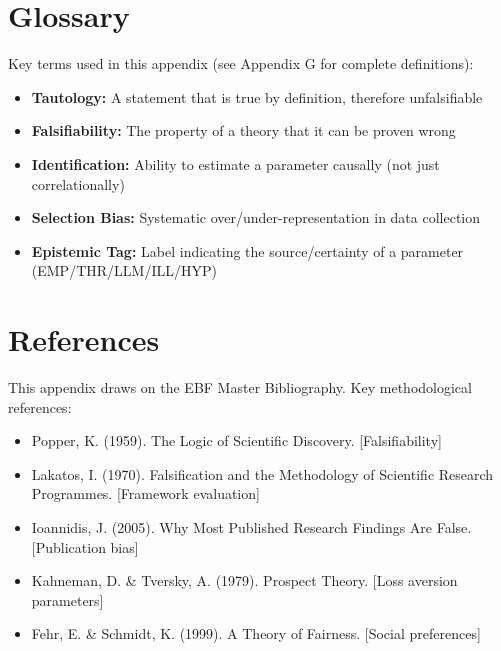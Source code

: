 \section{Glossary}
\label{sec:da-glossary}

Key terms used in this appendix (see Appendix G for complete definitions):

\begin{itemize}[nosep]
    \item \textbf{Tautology:} A statement that is true by definition, therefore unfalsifiable
    \item \textbf{Falsifiability:} The property of a theory that it can be proven wrong
    \item \textbf{Identification:} Ability to estimate a parameter causally (not just correlationally)
    \item \textbf{Selection Bias:} Systematic over/under-representation in data collection
    \item \textbf{Epistemic Tag:} Label indicating the source/certainty of a parameter (EMP/THR/LLM/ILL/HYP)
\end{itemize}

\section{References}
\label{sec:da-references}

This appendix draws on the EBF Master Bibliography. Key methodological references:

\nocite{bcm_master}

\begin{itemize}[nosep]
    \item Popper, K. (1959). The Logic of Scientific Discovery. [Falsifiability]
    \item Lakatos, I. (1970). Falsification and the Methodology of Scientific Research Programmes. [Framework evaluation]
    \item Ioannidis, J. (2005). Why Most Published Research Findings Are False. [Publication bias]
    \item Kahneman, D. \& Tversky, A. (1979). Prospect Theory. [Loss aversion parameters]
    \item Fehr, E. \& Schmidt, K. (1999). A Theory of Fairness. [Social preferences]
\end{itemize}


